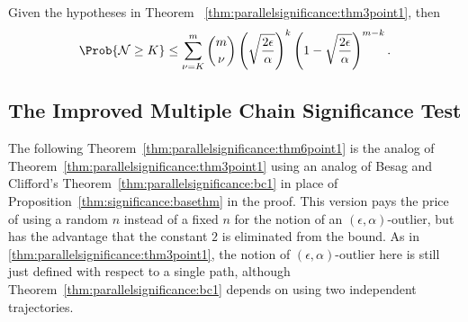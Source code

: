 \documentclass[12pt]{article}
\begin{document}
\begin{corollary}
    Given the hypotheses in Theorem~%
    \ref{thm:parallelsignificance:thm3point1}, then
    \[
        \Prob{\mathcal{N} \ge K} \le \sum\limits_{\nu=K}^m \binom{m}{\nu}
        \left( \sqrt{\frac{2\epsilon}{\alpha}} \right)^{k} \left( 1 -
        \sqrt{\frac{2\epsilon}{\alpha}} \right)^{m-k}.
    \]
\end{corollary}

\subsection*{The Improved Multiple Chain Significance Test}

The following Theorem~\ref{thm:parallelsignificance:thm6point1} is the analog of
Theorem~\ref{thm:parallelsignificance:thm3point1} using an analog of Besag and Clifford’s Theorem~\ref{thm:parallelsignificance:bc1} in
place of Proposition~\ref{thm:significance:basethm} in the proof. This version pays the price of using a
random \( n \) instead of a fixed \( n \) for the notion of an \(
(\epsilon, \alpha) \)-outlier,
but has the advantage that the constant \( 2 \) is eliminated from
the bound. As in \ref{thm:parallelsignificance:thm3point1},
the notion of \( (\epsilon, \alpha) \)-outlier here is still just defined with respect to a single
path, although Theorem~\ref{thm:parallelsignificance:bc1} depends on using two independent
trajectories.
\end{document}
